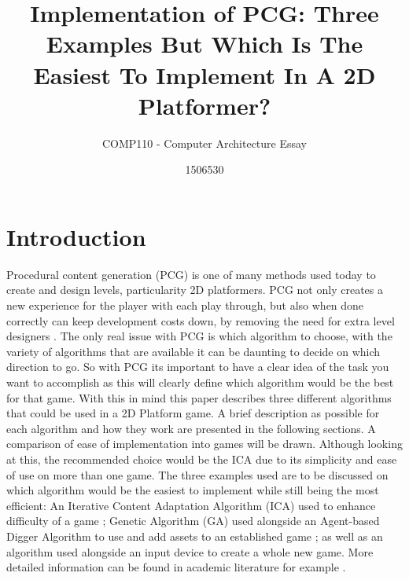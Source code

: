 \documentclass{scrartcl}
\title{Implementation of PCG: Three Examples But Which Is The Easiest To Implement In A 2D Platformer?}
\subtitle{COMP110 - Computer Architecture Essay}
\author{1506530}
\begin{document}
\maketitle


\section{Introduction}

Procedural content generation (PCG) is one of many methods used today to create and design levels, particularity 2D platformers. PCG not only creates a new experience for the player with each play through, but also when done correctly can keep development costs down, by removing the need for extra level designers \cite{walaa}. The only real issue with PCG is which algorithm to choose, with the variety of algorithms that are available it can be daunting to decide on which direction to go. So with PCG its important to have a clear idea of the task you want to accomplish as this will clearly define which algorithm would be the best for that game. With this in mind this paper describes three different algorithms that could be used in a 2D Platform game. 
\newline
\newline
A brief description as possible for each algorithm and how they work are presented in the following sections. A comparison of ease of implementation into games will be drawn. Although looking at this, the recommended choice would be the ICA due to its simplicity and ease of use on more than one game. The three examples used are to be discussed on which algorithm would be the easiest to implement while still being the most efficient: An Iterative Content Adaptation Algorithm (ICA) used to enhance difficulty of a game \cite{fausto}; Genetic Algorithm (GA) used alongside an Agent-based Digger Algorithm to use and add assets to an established game \cite{walaa}; as well as an algorithm used alongside an input device to create a whole new game\cite{web}. More detailed information can be found in academic literature for example \cite{fausto,walaa,web}.
\newpage
\end{document}
